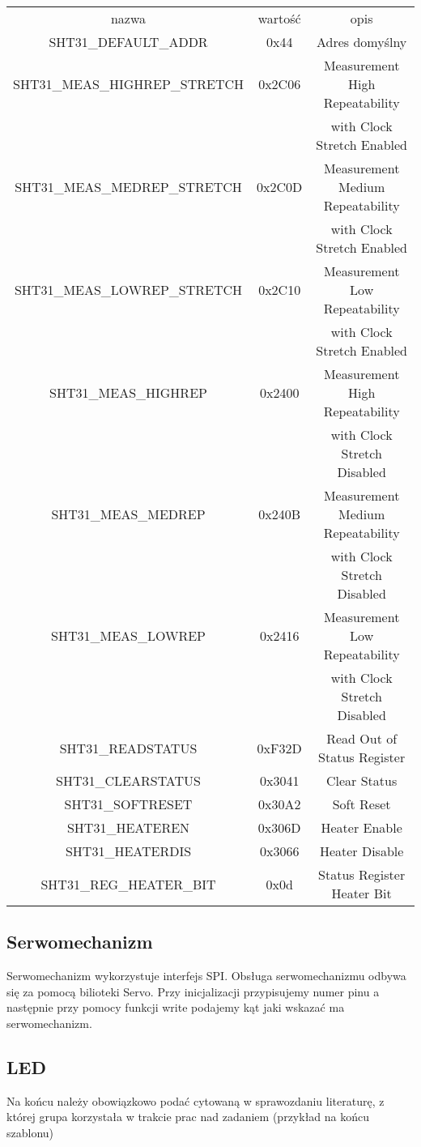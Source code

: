 \documentclass{classrep}
\begin{document}
\begin{center}
\begin{tabular}{ c c c }
nazwa & wartość & opis \\
SHT31\_DEFAULT\_ADDR & 0x44 & Adres domyślny \\
SHT31\_MEAS\_HIGHREP\_STRETCH & 0x2C06 & Measurement High Repeatability \\
 &  & with Clock Stretch Enabled \\
SHT31\_MEAS\_MEDREP\_STRETCH & 0x2C0D & Measurement Medium Repeatability \\
 &  & with Clock Stretch Enabled \\
SHT31\_MEAS\_LOWREP\_STRETCH & 0x2C10 & Measurement Low Repeatability \\
 &  & with Clock Stretch Enabled \\
SHT31\_MEAS\_HIGHREP & 0x2400 & Measurement High Repeatability \\
 &  & with Clock Stretch Disabled \\
SHT31\_MEAS\_MEDREP & 0x240B & Measurement Medium Repeatability \\
 &  & with Clock Stretch Disabled \\
SHT31\_MEAS\_LOWREP & 0x2416 & Measurement Low Repeatability \\
 &  & with Clock Stretch Disabled \\
SHT31\_READSTATUS & 0xF32D & Read Out of Status Register \\
SHT31\_CLEARSTATUS & 0x3041 & Clear Status \\
SHT31\_SOFTRESET & 0x30A2 & Soft Reset \\
SHT31\_HEATEREN & 0x306D & Heater Enable \\
SHT31\_HEATERDIS & 0x3066 & Heater Disable \\
SHT31\_REG\_HEATER\_BIT & 0x0d & Status Register Heater Bit  \\
\end{tabular}
\end{center}

\subsection {Serwomechanizm}
Serwomechanizm wykorzystuje interfejs SPI. Obsługa serwomechanizmu odbywa się za pomocą bilioteki Servo. Przy inicjalizacji przypisujemy numer pinu a następnie przy pomocy funkcji write podajemy kąt jaki wskazać ma serwomechanizm.

\subsection {LED}

\begin{thebibliography}{0}
\end{thebibliography}
{\color{blue} 
Na końcu należy obowiązkowo podać cytowaną w sprawozdaniu
literaturę, z której grupa korzystała w trakcie prac nad zadaniem (przykład na
końcu szablonu)}
\end{document}
